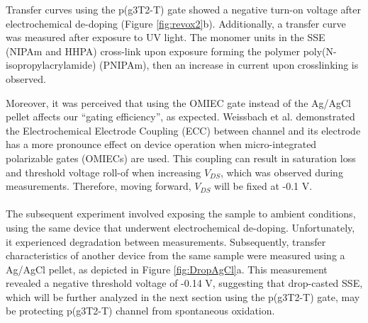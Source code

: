 Transfer curves using the p(g3T2-T) gate showed a negative turn-on voltage after electrochemical de-doping (Figure \ref{fig:revox2}b). Additionally, a transfer curve was measured after exposure to UV light. The monomer units in the SSE (NIPAm and HHPA) cross-link upon exposure forming the polymer poly(N-isopropylacrylamide) (PNIPAm), then an increase in current upon crosslinking is observed.

Moreover, it was perceived that using the OMIEC gate instead of the Ag/AgCl pellet affects our ``gating efficiency'', as expected. Weissbach et al.  \cite{weissbachUnravelingElectrochemicalElectrode2023} demonstrated the Electrochemical Electrode Coupling (ECC) between channel and its electrode has a more pronounce effect on device operation when micro-integrated polarizable gates (OMIECs) are used. This coupling can result in saturation loss %
and threshold voltage roll-of when increasing $V_{DS}$, which was observed during measurements. Therefore, moving forward, $V_{DS}$ will be fixed at -0.1 V.
\\\\
The subsequent experiment involved exposing the sample to ambient conditions, using the same device that underwent electrochemical de-doping. Unfortunately, it experienced degradation between measurements. Subsequently, transfer characteristics of another device from the same sample were measured using a Ag/AgCl pellet, as depicted in Figure \ref{fig:DropAgCl}a. This measurement revealed a negative threshold voltage of -0.14 V, suggesting that drop-casted SSE, which will be further analyzed in the next section using the p(g3T2-T) gate, may be protecting p(g3T2-T) channel from spontaneous oxidation.%

